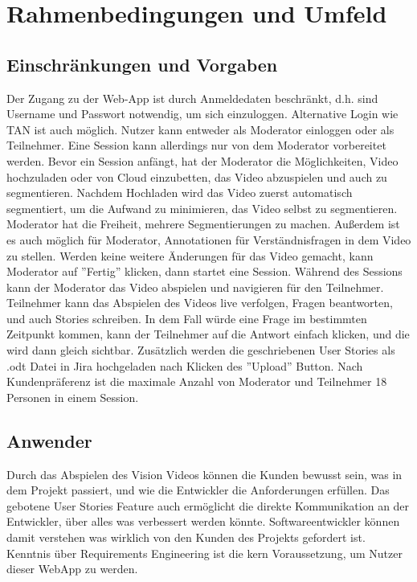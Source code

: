 \section{Rahmenbedingungen und Umfeld}

\subsection{Einschränkungen und Vorgaben}
Der Zugang zu der Web-App ist durch Anmeldedaten beschränkt, d.h. sind Username und Passwort notwendig, um sich einzuloggen. Alternative Login wie TAN ist auch möglich. Nutzer kann entweder als Moderator einloggen oder als Teilnehmer. Eine Session kann allerdings nur von dem Moderator vorbereitet werden.
\linebreak
\linebreak
Bevor ein Session anfängt, hat der Moderator die Möglichkeiten, Video hochzuladen oder von Cloud einzubetten, das Video abzuspielen und auch zu segmentieren. Nachdem Hochladen wird das Video zuerst automatisch segmentiert, um die Aufwand zu minimieren, das Video selbst zu segmentieren. Moderator hat die Freiheit, mehrere Segmentierungen zu machen. Außerdem ist es auch möglich für Moderator, Annotationen für Verständnisfragen in dem Video zu stellen. Werden keine weitere Änderungen für das Video gemacht, kann Moderator auf ''Fertig'' klicken, dann startet eine Session.
\linebreak
\linebreak
Während des Sessions kann der Moderator das Video abspielen und navigieren für den Teilnehmer. Teilnehmer kann das Abspielen des Videos live verfolgen, Fragen beantworten, und auch Stories schreiben. In dem Fall würde eine Frage im bestimmten Zeitpunkt kommen, kann der Teilnehmer auf die Antwort einfach klicken, und die wird dann gleich sichtbar. Zusätzlich werden die geschriebenen User Stories als .odt Datei in Jira hochgeladen nach Klicken des ''Upload'' Button. \linebreak
\linebreak
Nach Kundenpräferenz ist die maximale Anzahl von Moderator und Teilnehmer 18 Personen in einem Session.

\subsection{Anwender}
Durch das Abspielen des Vision Videos können die Kunden bewusst sein, was in dem Projekt passiert, und wie die Entwickler die Anforderungen erfüllen. Das gebotene User Stories Feature auch ermöglicht die direkte Kommunikation an der Entwickler, über alles was verbessert werden könnte. Softwareentwickler können damit verstehen was wirklich von den Kunden des Projekts gefordert ist. Kenntnis über Requirements Engineering ist die kern Voraussetzung, um Nutzer dieser WebApp zu werden.

